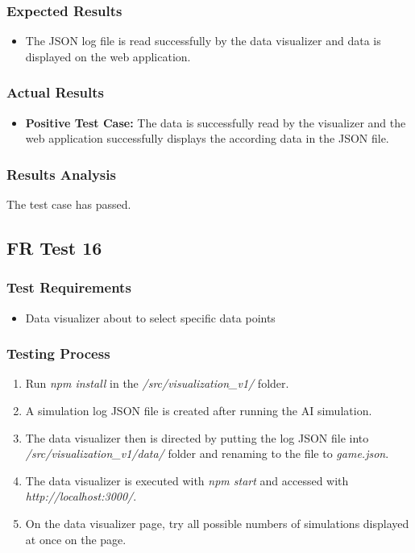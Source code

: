 \documentclass[12pt, titlepage]{article}
\begin{document}
\subsubsection{Expected Results}
\begin{itemize}
    \item The JSON log file is read successfully by the data visualizer and data is displayed on the web application.
\end{itemize}
\subsubsection{Actual Results}
\begin{itemize}
    \item \textbf{Positive Test Case:} The data is successfully read by the visualizer and the web application successfully displays the according data in the JSON file.
\end{itemize}
\subsubsection{Results Analysis}
The test case has passed.

\subsection{FR Test 16}
\subsubsection{Test Requirements}
\begin{itemize}
    \item Data visualizer about to select specific data points
\end{itemize}
\subsubsection{Testing Process}
\begin{enumerate}
    \item Run \textit{npm install} in the \textit{/src/visualization\_v1/} folder.
    \item A simulation log JSON file is created after running the AI simulation.
    \item The data visualizer then is directed by putting the log JSON file into \textit{/src/visualization\_v1/data/} folder and renaming to the file to \textit{game.json}.
    \item The data visualizer is executed with \textit{npm start} and accessed with \textit{http://localhost:3000/}.
    \item On the data visualizer page, try all possible numbers of simulations displayed at once on the page.
\end{enumerate}
\end{document}
